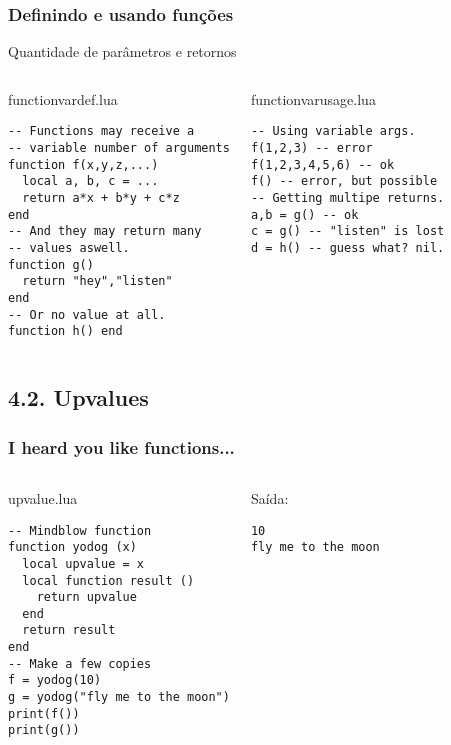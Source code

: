 \documentclass[brazil]{beamer}
\begin{document}
\begin{frame}[fragile]
  \frametitle{Definindo e usando funções}
  \pause
  \begin{center}
    Quantidade de parâmetros e retornos
  \end{center}
  \pause
  \begin{columns}
      \begin{block}{functionvardef.lua}
        \begin{lstlisting}
-- Functions may receive a
-- variable number of arguments
function f(x,y,z,...)
  local a, b, c = ...
  return a*x + b*y + c*z
end
-- And they may return many
-- values aswell.
function g()
  return "hey","listen"
end
-- Or no value at all.
function h() end
        \end{lstlisting}
      \end{block}
    \pause
      \begin{block}{functionvarusage.lua}
        \begin{lstlisting}
-- Using variable args.
f(1,2,3) -- error
f(1,2,3,4,5,6) -- ok
f() -- error, but possible
-- Getting multipe returns.
a,b = g() -- ok
c = g() -- "listen" is lost
d = h() -- guess what? nil.
        \end{lstlisting}
      \end{block}
  \end{columns}
\end{frame}
\subsection{4.2. Upvalues}
\begin{frame}[fragile]
  \frametitle{I heard you like functions...}
  \pause
  \begin{columns}
      \begin{block}{upvalue.lua}
        \begin{lstlisting}
-- Mindblow function
function yodog (x)
  local upvalue = x
  local function result ()
    return upvalue
  end
  return result
end
-- Make a few copies
f = yodog(10)
g = yodog("fly me to the moon")
print(f())
print(g())
        \end{lstlisting}
      \end{block}
    \pause
      \begin{block}{Saída:}
        \begin{verbatim}
10
fly me to the moon \end{verbatim}
      \end{block}
  \end{columns}
\end{frame}
\end{document}

